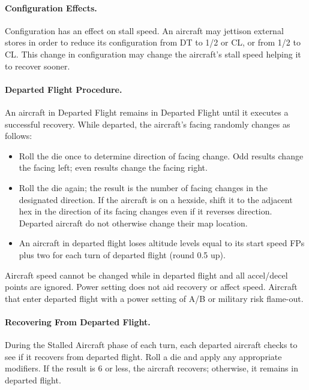 \paragraph{Configuration Effects.} Configuration has an effect on stall speed. An aircraft may jettison external stores in order to reduce its configuration from DT to 1/2 or CL, or from 1/2 to CL. This change in configuration may change the aircraft's stall speed helping it to recover sooner.

\paragraph{Departed Flight Procedure.} An aircraft in Departed Flight remains in Departed Flight until it executes a successful recovery. While departed, the aircraft's facing randomly changes as follows:

\begin{itemize}

    \item Roll the die once to determine direction of facing change. Odd results change the facing left; even results change the facing right.

    \item Roll the die again; the result is the number of facing changes in the designated direction. If the aircraft is on a hexside, shift it to the adjacent hex in the direction of its facing changes even if it reverses direction. Departed aircraft do not otherwise change their map location.

    \item An aircraft in departed flight loses altitude levels equal to its start speed FPs plus two for each turn of departed flight (round 0.5 up).

\end{itemize}

Aircraft speed cannot be changed while in departed flight and all accel/decel points are ignored. Power setting does not aid recovery or affect speed. Aircraft that enter departed flight with a power setting of A/B or military risk flame-out.

\paragraph{Recovering From Departed Flight.} During the Stalled Aircraft phase of each turn, each departed aircraft checks to see if it recovers from departed flight. Roll a die and apply any appropriate modifiers. If the result is 6 or less, the aircraft recovers; otherwise, it remains in departed flight.

